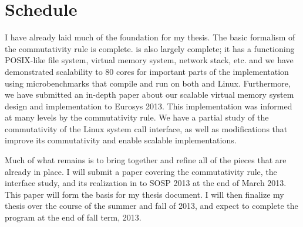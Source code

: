 \section{Schedule}

I have already laid much of the foundation for my thesis.  The basic
formalism of the commutativity rule is complete.  \sys is also largely
complete; it has a functioning POSIX-like file system, virtual memory
system, network stack, etc. and we have demonstrated scalability to 80
cores for important parts of the implementation using microbenchmarks
that compile and run on both \sys and Linux.  Furthermore, we have
submitted an in-depth paper about our scalable virtual memory system
design and implementation to Eurosys 2013.  This implementation was
informed at many levels by the commutativity rule.  We have a partial
study of the commutativity of the Linux system call interface, as well
as modifications that improve its commutativity and enable scalable
implementations.

Much of what remains is to bring together and refine all of the pieces
that are already in place.  I will submit a paper covering the
commutativity rule, the interface study, and its realization in \sys
to SOSP 2013 at the end of March 2013.  This paper will form the basis
for my thesis document.  I will then finalize my thesis over the
course of the summer and fall of 2013, and expect to complete the
program at the end of fall term, 2013.
